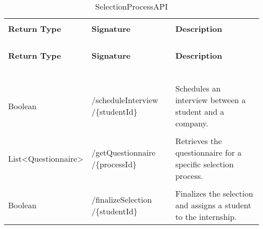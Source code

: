 \begin{longtable}{p{}p{}p{}}
    \caption{SelectionProcessAPI}
    \vspace{0.5em}\\
    \hline
    \vspace{0.5em}\\
    \textbf{Return Type} & \textbf{Signature} & \textbf{Description} \\
    \vspace{0.5em}\\
    \hline
    \vspace{0.5em}\\
    \endfirsthead
    \vspace{0.5em}\\
    \hline
    \vspace{0.5em}\\
    \textbf{Return Type} & \textbf{Signature} & \textbf{Description} \\
    \vspace{0.5em}\\
    \hline
    \vspace{0.5em}\\
    \endhead
    
    \vspace{0.5em}\\
    \hline
    \vspace{0.5em}\\
    \endfoot
    
    \vspace{0.5em}\\
    \hline
    \vspace{0.5em}\\
    \endlastfoot
    
    Boolean &
    /scheduleInterview /\{studentId\} &
    Schedules an interview between a student and a company. \\
    \vspace{0.5em}\\
    List<Questionnaire> &
    /getQuestionnaire /\{processId\} &
    Retrieves the questionnaire for a specific selection process. \\
    \vspace{0.5em}\\
    Boolean &
    /finalizeSelection /\{studentId\} &
    Finalizes the selection and assigns a student to the internship. \\

\end{longtable}

